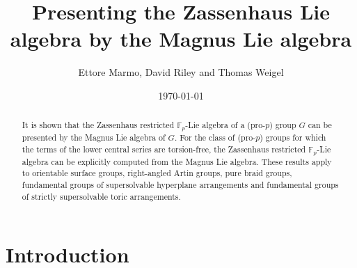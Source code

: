 \documentclass{amsart}
\title{Presenting the Zassenhaus Lie algebra by the Magnus Lie algebra}
\author{Ettore Marmo, David Riley and Thomas Weigel}
\date{\today}
\theoremstyle{plain}
\theoremstyle{definition}
\numberwithin{theorem}{section}
\numberwithin{equation}{section}
\newcommand{\FF}{\mathbb{F}}
\begin{document}
\setcounter{page}{1}


\begin{abstract}
It is shown that the Zassenhaus restricted $\FF_p$-Lie algebra of a (pro-$p$) group $G$ can be presented by the Magnus Lie algebra of $G$. For the class of (pro-$p$) groups for which the terms of the lower central series are torsion-free, 
 the
Zassenhaus restricted $\FF_p$-Lie algebra can be explicitly computed from the Magnus Lie algebra. 
These results apply to orientable surface groups, right-angled Artin groups, pure braid groups, fundamental groups of supersolvable hyperplane arrangements and fundamental groups of strictly supersolvable toric arrangements.
\end{abstract}


\maketitle


\section{Introduction}
\end{document}
